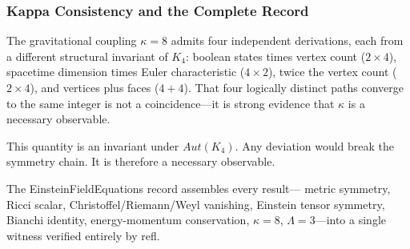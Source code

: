 \documentclass[11pt,a4paper]{book}
\def\mathrm#1{#1}%
\def\texttt#1{#1}%
\begin{document}
\subsubsection*{Kappa Consistency and the Complete Record}

The gravitational coupling $\kappa = 8$ admits four independent
derivations, each from a different structural invariant of $K_4$:
boolean states times vertex count ($2 \times 4$), spacetime dimension
times Euler characteristic ($4 \times 2$), twice the vertex count
($2 \times 4$), and vertices plus faces ($4 + 4$). That four
logically distinct paths converge to the same integer is not a
coincidence---it is strong evidence that $\kappa$ is a necessary
observable.

This quantity is an invariant under $\mathrm{Aut}(K_4)$. Any
deviation would break the symmetry chain. It is therefore a
necessary observable.

The \texttt{EinsteinFieldEquations} record assembles every result---
metric symmetry, Ricci scalar, Christoffel/Riemann/Weyl vanishing,
Einstein tensor symmetry, Bianchi identity, energy-momentum
conservation, $\kappa = 8$, $\Lambda = 3$---into a single
witness verified entirely by \texttt{refl}.
\end{document}
